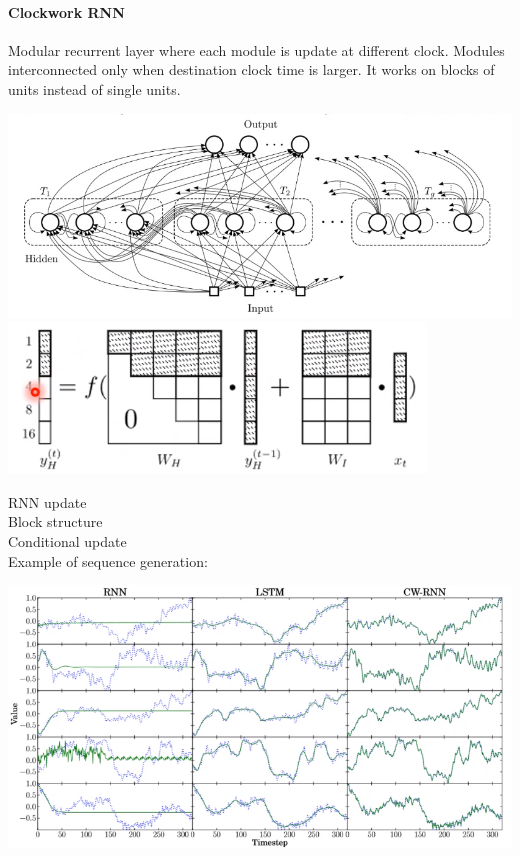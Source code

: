 \documentclass[10pt]{report}
\begin{document}
\paragraph{Clockwork RNN} Modular recurrent layer where each module is update at different clock. Modules interconnected only when destination clock time is larger. It works on blocks of units instead of single units.
\begin{center}
	\includegraphics[scale=0.5]{122.png}\\
	\includegraphics[scale=0.5]{123.png}
\end{center}
RNN update $$ $$
Block structure $$ $$
Conditional update $$ $$
Example of sequence generation:
\begin{center}
	\includegraphics[scale=0.5]{124.png}
\end{center}
\end{document}
